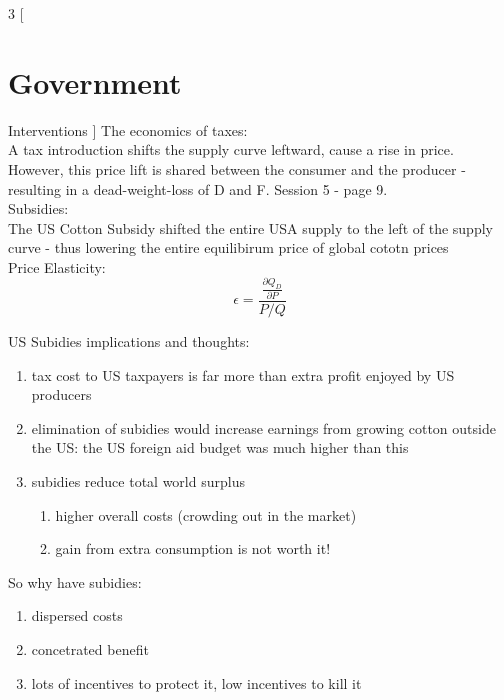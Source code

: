 \documentclass[8pt]{report}
\begin{document}
\begin{multicols}{3}
[
\section{Government}
Interventions
]
The economics of taxes: \\
A tax introduction shifts the supply curve leftward, cause a rise in price. However, this price lift is shared between the consumer and the producer - resulting in a dead-weight-loss of D and F. Session 5 - page 9. \\

Subsidies: \\
The US Cotton Subsidy shifted the entire USA supply to the left of the supply curve - thus lowering the entire equilibirum price of global cototn prices \\

Price Elasticity:
$$
	\epsilon = \frac{ \frac{\partial Q_D}{\partial P}}{P/Q}
$$

US Subidies implications and thoughts:
\begin{enumerate}
\item tax cost to US taxpayers is far more than extra profit enjoyed by US producers 
\item elimination of subidies would increase earnings from growing cotton outside the US: the US foreign aid budget was much higher than this
\item subidies reduce total world surplus
	\begin{enumerate}
		\item higher overall costs (crowding out in the market)
		\item gain from extra consumption is not worth it! 
	\end{enumerate}
\end{enumerate}

So why have subidies: \\
\begin{enumerate}
\item dispersed costs
\item concetrated benefit
\item lots of incentives to protect it, low incentives to kill it
\end{enumerate}
\end{multicols}
\end{document}
